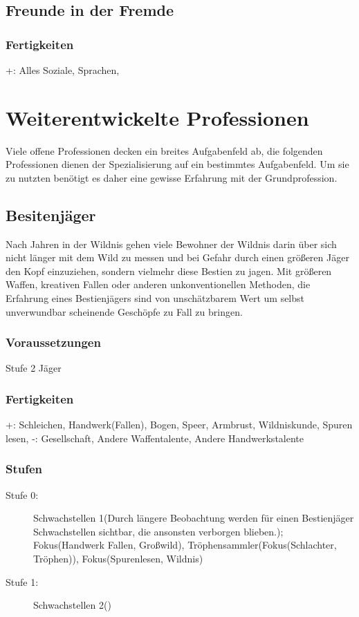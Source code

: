 \documentclass[a4paper,12pt,oneside]{book}
\begin{document}
\section{Freunde in der Fremde}
\subsection{Fertigkeiten}
+: Alles Soziale, Sprachen, 
%
\chapter{Weiterentwickelte Professionen}
Viele offene Professionen decken ein breites Aufgabenfeld ab, die folgenden Professionen dienen der Spezialisierung auf ein bestimmtes Aufgabenfeld. Um sie zu nutzten benötigt es daher eine gewisse Erfahrung mit der Grundprofession.
\section{Besitenjäger}
Nach Jahren in der Wildnis gehen viele Bewohner der Wildnis darin über sich nicht länger mit dem Wild zu messen und bei Gefahr durch einen größeren Jäger den Kopf einzuziehen, sondern vielmehr diese Bestien zu jagen. Mit größeren Waffen, kreativen Fallen oder anderen unkonventionellen Methoden, die Erfahrung eines Bestienjägers sind von unschätzbarem Wert um selbst unverwundbar scheinende Geschöpfe zu Fall zu bringen.
\subsection{Voraussetzungen}
Stufe 2 Jäger
\subsection{Fertigkeiten}
+: Schleichen, Handwerk(Fallen), Bogen, Speer, Armbrust, Wildniskunde, Spuren lesen, 
-: Gesellschaft, Andere Waffentalente, Andere Handwerkstalente
\subsection{Stufen}
\begin{description}
\item[Stufe 0:] Schwachstellen 1(Durch längere Beobachtung werden für einen Bestienjäger Schwachstellen sichtbar, die ansonsten verborgen blieben.); Fokus(Handwerk Fallen, Großwild), Tröphensammler(Fokus(Schlachter, Tröphen)), Fokus(Spurenlesen, Wildnis)
\item[Stufe 1:] Schwachstellen 2()
\end{description}
\end{document}
